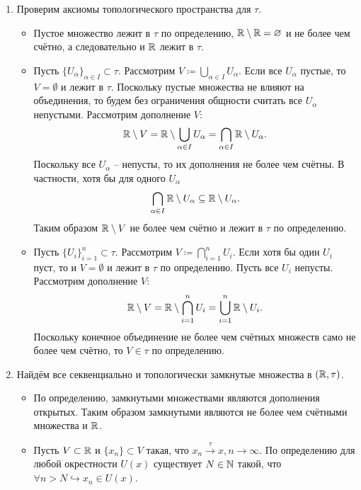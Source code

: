 \begin{solve}
    \begin{enumerate}
        \item Проверим аксиомы топологического пространства для $\tau$.
        \begin{itemize}
            \item Пустое множество лежит в $\tau$ по определению, $\mathbb{R} \setminus \mathbb{R} = \varnothing$ и не более чем счётно, а следовательно и $\mathbb{R}$ лежит в $\tau$.
            \item Пусть $\{U_\alpha\}_{\alpha \in I} \subset \tau$. Рассмотрим $V \coloneq \bigcup_{\alpha \in I} U_\alpha$. Если все $U_\alpha$ пустые, то $V = \emptyset$ и лежит в $\tau$. Поскольку пустые множества не влияют на объединения, то будем без ограничения общности считать все $U_\alpha$ непустыми. Рассмотрим дополнение $V\colon$
            \[
                \mathbb{R} \setminus V = \mathbb{R} \setminus \bigcup_{\alpha \in I} U_\alpha = \bigcap_{\alpha \in I} \mathbb{R} \setminus U_\alpha.
            \]
            Поскольку все $U_\alpha$ -- непусты, то их дополнения не более чем счётны. В частности, хотя бы для одного $U_\alpha$
            \[
                \bigcap_{\alpha \in I} \mathbb{R} \setminus U_\alpha \subseteq \mathbb{R}\setminus U_{\alpha}.
            \]
            Таким образом $\mathbb{R} \setminus V$ не более чем счётно и лежит в $\tau$ по определению.
            \item Пусть $\{U_i\}_{i = 1}^n \subset \tau$. Рассмотрим $V \coloneq \bigcap_{i = 1}^n U_i$. Если хотя бы один $U_i$ пуст, то и $V = \emptyset$ и лежит в $\tau$ по определению. Пусть все $U_i$ непусты. Рассмотрим дополнение $V\colon$
            \[
                \mathbb{R} \setminus V = \mathbb{R} \setminus \bigcap_{i = 1}^n U_i = \bigcup_{i = 1}^n \mathbb{R} \setminus U_i.
            \]
            Поскольку конечное объединение не более чем счётных множеств само не более чем счётно, то $V \in \tau$ по определению.
        \end{itemize}
        \item Найдём все секвенциально и топологически замкнутые множества в $(\mathbb{R}, \tau)$.
        \begin{itemize}
            \item По определению, замкнутыми множествами являются дополнения открытых. Таким образом замкнутыми являются не более чем счётными множества и $\mathbb{R}$.
            \item Пусть $V \subset \mathbb{R}$ и $\{x_n\} \subset V$ такая, что $x_n \xrightarrow{\tau} x, n \rightarrow \infty$. По определению для любой окрестности $U(x)$ существует $N \in \mathbb{N}$ такой, что $\forall n > N \hookrightarrow x_n \in U(x)$.

\end{itemize}
\end{enumerate}
\end{solve}
